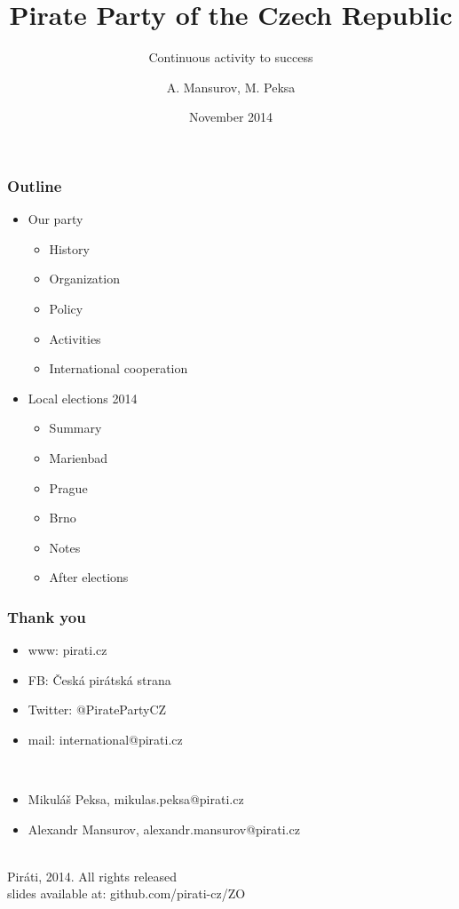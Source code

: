 \documentclass[sans]{beamer}
\begin{document}
	\title{Pirate Party of the Czech Republic}
	\subtitle{Continuous activity to success}
	\author{A. Mansurov, M. Peksa}
	\date{November 2014}
	
	\frame{\titlepage}
	\begin{frame}
		\frametitle{Outline}
		\begin{itemize}
			\item Our party
				\begin{itemize}
					\item History
					\item Organization
					\item Policy
					\item Activities
					\item International cooperation
				\end{itemize}
			\item Local elections 2014
				\begin{itemize}
					\item Summary
					\item Marienbad
					\item Prague
					\item Brno
					\item Notes
					\item After elections
				\end{itemize}
		\end{itemize}
	\end{frame}
	
	
	\begin{frame}
		\frametitle{Thank you}
		\begin{itemize}
		\item www: pirati.cz
		\item FB: \v{C}esk\'a pir\'atsk\'a strana
		\item Twitter: @PiratePartyCZ
		\item mail: international@pirati.cz
		\end{itemize}
		~\\
		\begin{itemize}
		\item Mikul\'a\v{s} Peksa, mikulas.peksa@pirati.cz
		\item Alexandr Mansurov, alexandr.mansurov@pirati.cz
		\end{itemize}
		~\\
		\textcopyleft Pir\'ati, 2014. All rights released\\
		slides available at: github.com/pirati-cz/ZO
	\end{frame}
\end{document}
